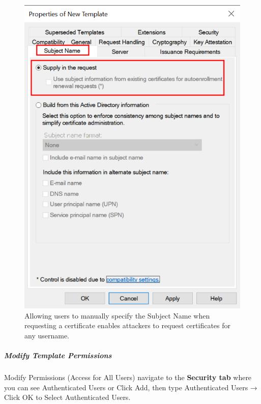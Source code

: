 \begin{figure}
    \centering
    \includegraphics[width=0.75\linewidth]{maketemp.png}
    \caption{Allowing users to manually specify the Subject Name when requesting a certificate enables attackers to request certificates for any username.}
    \label{fig:placeholder}
\end{figure}


\subparagraph{\textbf{Modify Template Permissions}}

Modify Permissions (Access for All Users) navigate to the \textbf{Security tab} where you can see Authenticated Users or Click Add, then type Authenticated Users → Click OK to Select Authenticated Users.

